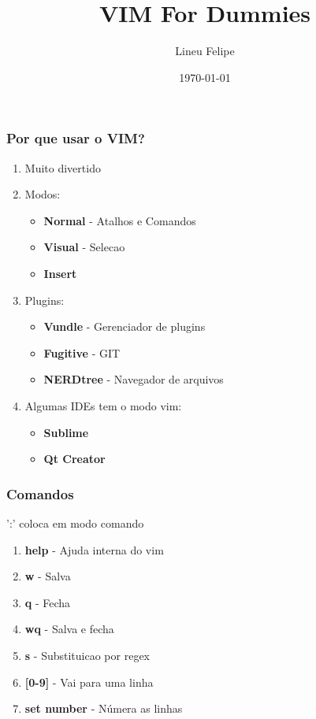 \documentclass[aspectratio=169]{beamer}
\title[\sc{VIM For Dummies}]{VIM For Dummies}
\author[Lineu Felipe]{Lineu Felipe}
\institute{Socialbase} %
\date{\today}
\begin{document}
\begin{frame}
    \titlepage
\end{frame}

\begin{frame}\frametitle{Por que usar o VIM?}
    \pause
    \begin{enumerate}
        \item<1-> Muito divertido \pause
        \item<2-> Modos:
            \begin{itemize}
                \item \textbf{Normal} - Atalhos e Comandos
                \item \textbf{Visual} - Selecao
                \item \textbf{Insert}
            \end{itemize}
            \pause
        \item<3-> Plugins:
            \begin{itemize}
                \item \textbf{Vundle} - Gerenciador de plugins
                \item \textbf{Fugitive} - GIT
                \item \textbf{NERDtree} - Navegador de arquivos
            \end{itemize}
            \pause
        \item<4-> Algumas IDEs tem o modo vim:
            \begin{itemize}
                \item \textbf{Sublime}
                \item \textbf{Qt Creator}
            \end{itemize}
    \end{enumerate}
\end{frame}

\begin{frame}\frametitle{Comandos}
    ':' coloca em modo comando
    \begin{enumerate}
        \item \textbf{help} - Ajuda interna do vim
        \item \textbf{w} - Salva
        \item \textbf{q} - Fecha
        \item \textbf{wq} - Salva e fecha
        \item \textbf{s} - Substituicao por regex
        \item \textbf{[0-9]} - Vai para uma linha
        \item \textbf{set number} - Númera as linhas
    \end{enumerate}
\end{frame}
\end{document}
